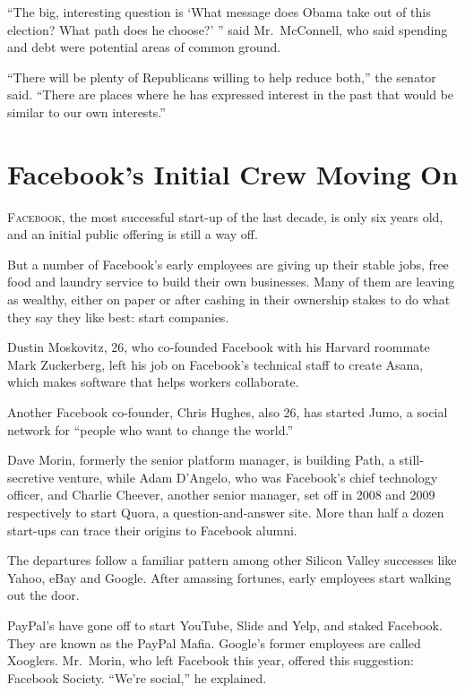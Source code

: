 ﻿\documentclass[12pt]{article}
\begin{document}
``The big, interesting question is `What message does Obama take out of this election? What path
does he choose?' '' said Mr.~McConnell, who said spending and debt were potential areas of common
ground.

``There will be plenty of Republicans willing to help reduce both,'' the senator said. ``There are
places where he has expressed interest in the past that would be similar to our own interests.''

\section{Facebook's Initial Crew Moving On}

\lettrine{F}{acebook}, the most successful start-up of the last decade, is
only six years old, and an initial public offering is still a way off.

But a number of Facebook's early employees are giving up their stable jobs, free food and laundry
service to build their own businesses. Many of them are leaving as wealthy, either on paper or after
cashing in their ownership stakes to do what they say they like best: start companies.

Dustin Moskovitz, 26, who co-founded Facebook with his Harvard roommate Mark Zuckerberg, left his
job on Facebook's technical staff to create Asana, which makes software that helps workers
collaborate.

Another Facebook co-founder, Chris Hughes, also 26, has started Jumo, a social network for ``people
who want to change the world.''

Dave Morin, formerly the senior platform manager, is building Path, a still-secretive venture, while
Adam D'Angelo, who was Facebook's chief technology officer, and Charlie Cheever, another senior
manager, set off in 2008 and 2009 respectively to start Quora, a question-and-answer site. More than
half a dozen start-ups can trace their origins to Facebook alumni.

The departures follow a familiar pattern among other Silicon Valley successes like Yahoo, eBay and
Google. After amassing fortunes, early employees start walking out the door.

PayPal's have gone off to start YouTube, Slide and Yelp, and staked Facebook. They are known as the
PayPal Mafia. Google's former employees are called Xooglers. Mr.~Morin, who left Facebook this year,
offered this suggestion: Facebook Society. ``We're social,'' he explained.
\end{document}
